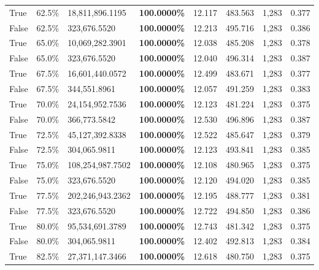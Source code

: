 \begin{table}[H]
\begin{tabular}{lllrllll}
\cline{1-8}
True & 62.5\% & 18,811,896.1195 & \bfseries \color{red} 100.0000\% & 12.117 & 483.563 & 1,283 & 0.377 \\
\cline{1-8}
False & 62.5\% & 323,676.5520 & \bfseries \color{red} 100.0000\% & 12.213 & 495.716 & 1,283 & 0.386 \\
\cline{1-8}
True & 65.0\% & 10,069,282.3901 & \bfseries \color{red} 100.0000\% & 12.038 & 485.208 & 1,283 & 0.378 \\
\cline{1-8}
False & 65.0\% & 323,676.5520 & \bfseries \color{red} 100.0000\% & 12.040 & 496.314 & 1,283 & 0.387 \\
\cline{1-8}
True & 67.5\% & 16,601,440.0572 & \bfseries \color{red} 100.0000\% & 12.499 & 483.671 & 1,283 & 0.377 \\
\cline{1-8}
False & 67.5\% & 344,551.8961 & \bfseries \color{red} 100.0000\% & 12.057 & 491.259 & 1,283 & 0.383 \\
\cline{1-8}
True & 70.0\% & 24,154,952.7536 & \bfseries \color{red} 100.0000\% & 12.123 & 481.224 & 1,283 & 0.375 \\
\cline{1-8}
False & 70.0\% & 366,773.5842 & \bfseries \color{red} 100.0000\% & 12.530 & 496.896 & 1,283 & 0.387 \\
\cline{1-8}
True & 72.5\% & 45,127,392.8338 & \bfseries \color{red} 100.0000\% & 12.522 & 485.647 & 1,283 & 0.379 \\
\cline{1-8}
False & 72.5\% & \color{red} 304,065.9811 & \bfseries \color{red} 100.0000\% & 12.123 & 493.841 & 1,283 & 0.385 \\
\cline{1-8}
True & 75.0\% & 108,254,987.7502 & \bfseries \color{red} 100.0000\% & 12.108 & 480.965 & 1,283 & 0.375 \\
\cline{1-8}
False & 75.0\% & 323,676.5520 & \bfseries \color{red} 100.0000\% & 12.120 & 494.020 & 1,283 & 0.385 \\
\cline{1-8}
True & 77.5\% & 202,246,943.2362 & \bfseries \color{red} 100.0000\% & 12.195 & 488.777 & 1,283 & 0.381 \\
\cline{1-8}
False & 77.5\% & 323,676.5520 & \bfseries \color{red} 100.0000\% & 12.722 & 494.850 & 1,283 & 0.386 \\
\cline{1-8}
True & 80.0\% & 95,534,691.3789 & \bfseries \color{red} 100.0000\% & 12.743 & 481.342 & 1,283 & 0.375 \\
\cline{1-8}
False & 80.0\% & \color{red} 304,065.9811 & \bfseries \color{red} 100.0000\% & 12.402 & 492.813 & 1,283 & 0.384 \\
\cline{1-8}
True & 82.5\% & 27,371,147.3466 & \bfseries \color{red} 100.0000\% & 12.618 & 480.750 & 1,283 & 0.375 \\

\end{tabular}
\end{table}
